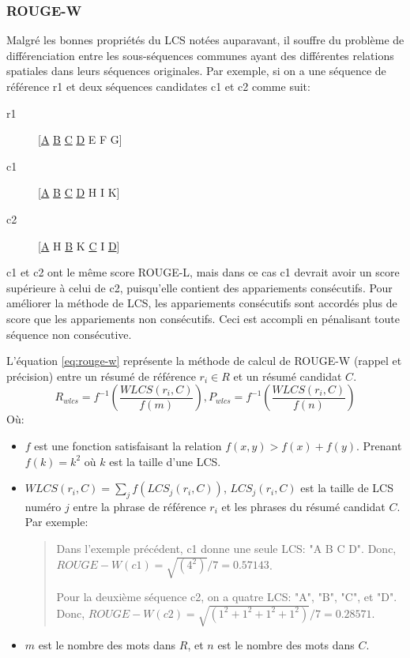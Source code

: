 \documentclass[a4paper,12pt,oneside]{../use/ESIthesis}
\begin{document}
\subsubsection{ROUGE-W}

Malgré les bonnes propriétés du LCS notées auparavant, il souffre du problème de différenciation entre les sous-séquences communes ayant des différentes relations spatiales dans leurs séquences originales.
Par exemple, si on a une séquence de référence r1 et deux séquences candidates c1 et c2 comme suit:
\begin{description}
\item[r1] [\underline{A} \underline{B} \underline{C} \underline{D} E F G]
\item[c1] [\underline{A} \underline{B} \underline{C} \underline{D} H I K]
\item[c2] [\underline{A} H \underline{B} K \underline{C} I \underline{D}]
\end{description}
c1 et c2 ont le même score ROUGE-L, mais dans ce cas c1 devrait avoir un score supérieure à celui de c2, puisqu'elle contient des appariements consécutifs. 
Pour améliorer la méthode de LCS, les appariements consécutifs sont accordés plus de score que les appariements non consécutifs. 
Ceci est accompli en pénalisant toute séquence non consécutive. 

L'équation \ref{eq:rouge-w} représente la méthode de calcul de ROUGE-W (rappel et précision) entre un résumé de référence $r_i \in R$ et un résumé candidat $C$. 
\begin{equation}
\label{eq:rouge-w}
R_{wlcs}= f^{-1}(\frac {WLCS(r_i,C)}{f(m)}), 
P_{wlcs}= f^{-1}(\frac {WLCS(r_i,C)}{f(n)})
\end{equation}
Où:
\begin{itemize}
\item $ f $ est une fonction satisfaisant la relation $ f(x,y)>f(x)+f(y) $. Prenant $ f(k) = k^2 $ où $ k $ est la taille d'une LCS.
\item $WLCS(r_i,C) = \sum_j f(LCS_j(r_i,C))$, $LCS_j(r_i,C)$ est la taille de LCS numéro $ j $ entre la phrase de référence $r_i$ et les phrases du résumé candidat $C$. Par exemple:
\begin{quote}
Dans l'exemple précédent, c1 donne une seule LCS: "A B C D". 
Donc, $ ROUGE-W(c1) = \sqrt{(4^2)}/7 = 0.57143 $. 

Pour la deuxième séquence c2, on a quatre LCS: "A", "B", "C", et "D". 
Donc, $ ROUGE-W(c2) = \sqrt{(1^2 + 1^2 + 1^2 + 1^2)}/7 = 0.28571 $. 
\end{quote}
\item $m$ est le nombre des mots dans $R$, et $n$ est le nombre des mots dans $C$. 
\end{itemize}
\end{document}

